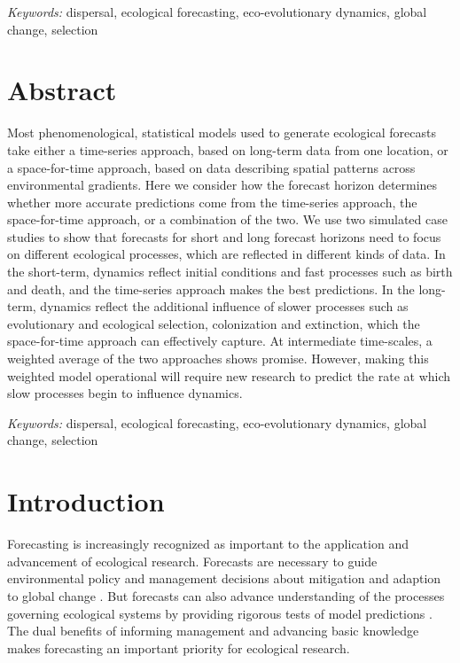 \documentclass[11pt]{article}
\begin{document}
\vspace{0.25cm}

\noindent \emph{Keywords:} dispersal, ecological forecasting, eco-evolutionary dynamics, global change, selection

\newpage 

\section*{Abstract} 
Most phenomenological, statistical models used to generate ecological forecasts take either a time-series approach, based on long-term data from one location, or a space-for-time approach, based on data describing spatial patterns across environmental gradients. Here we consider how the forecast horizon determines whether more accurate predictions come from the time-series approach, the space-for-time approach, or a combination of the two. We use two simulated case studies to show that forecasts for short and long forecast horizons need to focus on different ecological processes, which are reflected in different kinds of data. In the short-term, dynamics reflect initial conditions and fast processes such as birth and death, and the time-series approach makes the best predictions. In the long-term, dynamics reflect the additional influence of slower processes such as evolutionary and ecological selection, colonization and extinction, which the space-for-time approach can effectively capture. At intermediate time-scales, a weighted average of the two approaches shows promise. However, making this weighted model operational will require new research to predict the rate at which slow processes begin to influence dynamics.

\vspace{0.25cm}

\noindent \emph{Keywords:} dispersal, ecological forecasting, eco-evolutionary dynamics, global change, selection

\section*{Introduction}

Forecasting is increasingly recognized as important to the application and advancement of ecological research.
Forecasts are necessary to guide environmental policy and management
decisions about mitigation and adaption to global change \citep{clark_ecological_2001,mouquet_review:_2015,dietze_iterative_2018}.
But forecasts can also advance understanding of the processes governing ecological systems by providing rigorous tests of 
model predictions \citep{houlahan_priority_2017,dietze_prediction_2017,dietze_iterative_2018}.
The dual benefits of informing management and advancing basic knowledge 
makes forecasting an important priority for ecological research.
\end{document}
